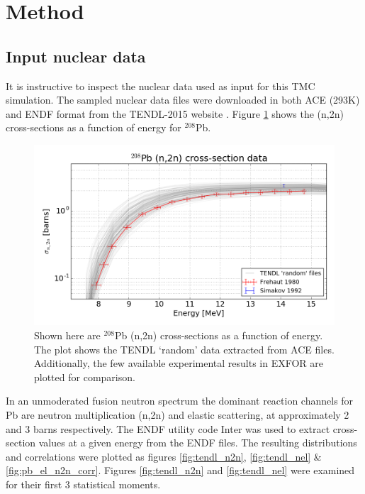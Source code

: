\section{Method}

\subsection{Input nuclear data}
\label{sec:data}
It is instructive to inspect the nuclear data used as input for this TMC simulation. The sampled nuclear data files were downloaded in both ACE (293K) and ENDF format from the TENDL-2015 website \cite{TENDL2015}. Figure \ref{fig:tendl_lead} shows the (n,2n) cross-sections as a function of energy for $^{208}$Pb. 



\begin{figure}
  \centering
  \includegraphics[width=\textwidth]{pb208_n2n_tendl_exfor.png}
  \caption{Shown here are $^{208}$Pb (n,2n) cross-sections as a function of energy. The plot shows the TENDL `random' data extracted from ACE files. Additionally, the few available experimental results in EXFOR are plotted for comparison.}
  \label{fig:tendl_lead}
\end{figure}

In an unmoderated fusion neutron spectrum the dominant reaction channels for Pb are neutron multiplication (n,2n) and elastic scattering, at approximately 2 and 3 barns respectively. The ENDF utility code Inter was used to extract cross-section values at a given energy from the ENDF files. The resulting distributions and correlations were plotted as figures \ref{fig:tendl_n2n}, \ref{fig:tendl_nel} \& \ref{fig:pb_el_n2n_corr}. Figures \ref{fig:tendl_n2n} and \ref{fig:tendl_nel} were examined for their first 3 statistical moments. 

